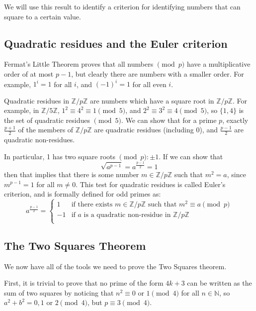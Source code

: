 \documentclass{article}
\begin{document}
We will use this result to identify a criterion for identifying numbers that can square to a 
certain value.

\subsection{Quadratic residues and the Euler criterion}

Fermat's Little Theorem proves that all numbers $\pmod{p}$ have a multiplicative order of at
most $p-1$, but clearly there are numbers with a smaller order. For example, $1^i = 1$ for all
$i$, and $(-1)^i = 1$ for all even $i$.

Quadratic residues in $\mathbb{Z}/p\mathbb{Z}$ are numbers which have a square root in
$\mathbb{Z}/p\mathbb{Z}$. For example, in $\mathbb{Z}/5\mathbb{Z}$, $1^2 \equiv 4^2 \equiv 1
\pmod{5}$, and $2^2 \equiv 3^2 \equiv 4 \pmod{5}$, so $\{1,4\}$ is the set of quadratic residues
$\pmod{5}$. We can show that for a prime $p$, exactly $\frac{p+1}{2}$ of the members of
$\mathbb{Z}/p\mathbb{Z}$ are quadratic residues (including 0), and $\frac{p-1}{2}$ are quadratic
non-residues.

In particular, 1 has two square roots $\pmod{p}: \pm 1$. If we can show that 
\[\sqrt{a^{p-1}} = a^{\frac{p-1}{2}} = 1\]
then that implies that there is some number $m \in \mathbb{Z}/p\mathbb{Z}$ such that $m^2 = a$,
since $m^{p-1} = 1$ for all $m \neq 0$. This test for quadratic residues is called Euler's
criterion, and is formally defined for odd primes as:
\[a^{\frac{p-1}{2}} =
\left\{
	\begin{array}{ll}
		1  & \mbox{if there exists } m \in \mathbb{Z}/p\mathbb{Z} \mbox{ such that } m^2 \equiv a \pmod{p} \\
		-1  & \mbox{if } a \mbox{ is a quadratic non-residue in } \mathbb{Z}/p\mathbb{Z} \\
	\end{array}
\right. \]

\subsection{The Two Squares Theorem}

We now have all of the tools we need to prove the Two Squares theorem.

First, it is trivial to prove that no prime of the form $4k+3$ can be written as the sum of two
squares by noticing that $n^2 \equiv 0 \mbox{ or } 1 \pmod{4}$ for all $n\in \mathbb{N}$, so 
$a^2+b^2 = 0,1 \mbox{ or } 2 \pmod{4}$, but $p \equiv 3 \pmod{4}$.
\end{document}
